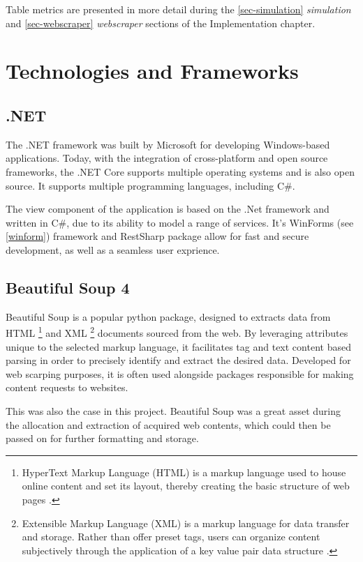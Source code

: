 \documentclass{thesis-ekf}
\theoremstyle{definition}
\theoremstyle{remark}
\begin{document}
{Table metrics are presented in more detail during the \ref{sec-simulation} \emph{simulation} and \ref{sec-webscraper} \emph{webscraper} sections of the Implementation chapter.

\section{Technologies and Frameworks}

\subsection{.NET}
The .NET framework was built by Microsoft for developing Windows-based applications. Today, with the integration of cross-platform and open source frameworks, the .NET Core supports multiple operating systems and is also open source. It supports multiple programming languages, including C\#. \cite{.net}

The view component of the application is based on the .Net framework and written in C\#, due to its ability to model a range of services. It's WinForms (see \ref{winform}) framework and RestSharp package allow for fast and secure development, as well as a seamless user exprience.

\subsection{Beautiful Soup 4}
Beautiful Soup \cite{bs4} is a popular python package, designed to extracts data from HTML 
  \footnote{HyperText Markup Language (HTML) is a markup language used to house online content and set its layout, thereby creating the basic structure of web pages \cite{mdn-html}.}
and XML 
  \footnote{Extensible Markup Language (XML) is a markup language for data transfer and storage.
  Rather than offer preset tags, users can organize content subjectively through the application of a key value pair data structure \cite{mdn-xml}.}
documents sourced from the web. By leveraging attributes unique to the selected markup language, it facilitates tag and text content based parsing in order to precisely identify and extract the desired data. Developed for web scarping purposes, it is often used alongside packages responsible for making content requests to websites. 

This was also the case in this project. Beautiful Soup was a great asset during the allocation and extraction of acquired web contents, which could then be passed on for further formatting and storage.

}
\end{document}
